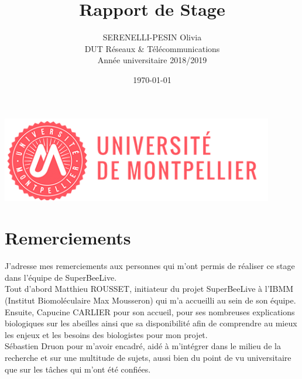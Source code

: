 \documentclass[11pt,french,a4paper]{report}
\title{\LARGE{Rapport de Stage}}
\author{\textsc{SERENELLI-PESIN} Olivia\\DUT Réseaux & Télécommunications\\Année universitaire 2018/2019}
\date{\today}
\begin{document}
\begin{titlepage}
\begin{center}
\includegraphics[scale=0.3]{../images/logo/um_logo.png}
\end{center}

\end{titlepage}
\clearpage
\newpage 

\chapter*{Remerciements}

J’adresse mes remerciements aux personnes qui m’ont permis de réaliser ce stage dans l’équipe de SuperBeeLive. \\
Tout d’abord Matthieu ROUSSET, initiateur du projet SuperBeeLive à l'IBMM (Institut Biomoléculaire Max Mousseron) 
qui m’a accueilli au sein de son équipe. \\

Ensuite, Capucine CARLIER pour son accueil, pour ses nombreuses explications biologiques sur les abeilles ainsi que sa disponibilité 
afin de comprendre au mieux les enjeux et les besoins des biologistes pour mon projet. \\

Sébastien Druon pour m’avoir encadré, aidé à m’intégrer dans le milieu de la recherche et sur une multitude 
de sujets, aussi bien du point de vu universitaire que sur les tâches qui m’ont été confiées. \\
\end{document}
